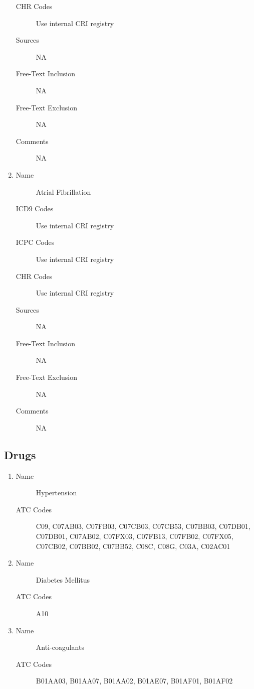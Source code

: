 \documentclass[a4paper,12pt]{article}
\begin{document}
\begin{appendices}
\begin{enumerate}
\begin{description}
   						\item[CHR Codes] Use internal CRI registry
   						\item[Sources] NA
   						\item[Free-Text Inclusion] NA
   						\item[Free-Text Exclusion] NA
   						\item[Comments] NA
   					\end{description}
   					\item
   					\begin{description}
   						\item[Name] Atrial Fibrillation
   						\item[ICD9 Codes] Use internal CRI registry
   						\item[ICPC Codes] Use internal CRI registry
   						\item[CHR Codes] Use internal CRI registry
   						\item[Sources] NA
   						\item[Free-Text Inclusion] NA
   						\item[Free-Text Exclusion] NA
   						\item[Comments] NA
   					\end{description}
	   			\end{enumerate}
   			
   			\subsection{Drugs}
   				\begin{enumerate}
   					\item
   					\begin{description}
   						\item[Name] Hypertension
   						\item[ATC Codes] C09, C07AB03, C07FB03, C07CB03, C07CB53, C07BB03, C07DB01, C07DB01, C07AB02, C07FX03, C07FB13, C07FB02, C07FX05, C07CB02, C07BB02, C07BB52, C08C, C08G, C03A, C02AC01
   					\end{description}
   					\item
   					\begin{description}
   						\item[Name] Diabetes Mellitus
   						\item[ATC Codes] A10
   					\end{description}
   					\item
   					\begin{description}
   						\item[Name] Anti-coagulants
   						\item[ATC Codes] B01AA03, B01AA07, B01AA02, B01AE07, B01AF01, B01AF02
   					\end{description}
   				\end{enumerate}
   				\newpage
   		

\end{appendices}
\end{document}
